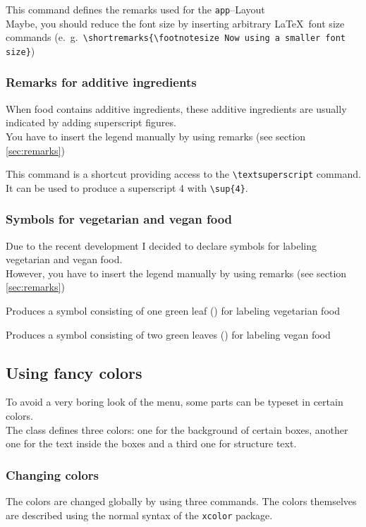 \documentclass[11pt]{ltxdoc}
\begin{document}
	\medskip
	\DescribeMacro{\shortremarks}
	This command defines the remarks used for the \texttt{app}--Layout \\
	Maybe, you should reduce the font size by inserting arbitrary \LaTeX\ font size commands (e.~g.~\verb|\shortremarks{\footnotesize Now using a smaller font size}|)
	
	
	\subsubsection{Remarks for additive ingredients}
	When food contains additive ingredients, these additive ingredients are usually indicated by adding superscript figures. \\
	You have to insert the legend manually by using remarks (see section \ref{sec:remarks})
	
	\medskip
	\DescribeMacro{\sup}
	This command is a shortcut providing access to the \verb|\textsuperscript| command. \\
	It can be used to produce a superscript 4 with \verb|\sup{4}|.
	
	
	\subsubsection{Symbols for vegetarian and vegan food}
	Due to the recent development I decided to declare symbols for labeling vegetarian and vegan food. \\
	However, you have to insert the legend manually by using remarks (see section \ref{sec:remarks})
	
	\medskip
	\DescribeMacro{\vgt}
	Produces a symbol consisting of one green leaf ({\color{green!50!black}\textleaf}) for labeling vegetarian food
	
	\medskip
	\DescribeMacro{\vgn}
	Produces a symbol consisting of two green leaves ({\color{green!50!black}\textleaf\textleaf}) for labeling vegan food
	
	
	\subsection{Using fancy colors}
	To avoid a very boring look of the menu, some parts can be typeset in certain colors. \\
	The class defines three colors: one for the background of certain boxes, another one for the text inside the boxes and a third one for structure text.
	
	\subsubsection{Changing colors}
	The colors are changed globally by using three commands. The colors themselves are described using the normal syntax of the \texttt{xcolor} package.
	
\end{document}
